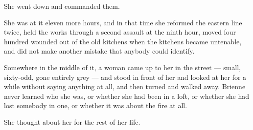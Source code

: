 \sceneBreak

She went down and commanded them.

She was at it eleven more hours, and in that time she reformed the eastern line twice, held the works through a second assault at the ninth hour, moved four hundred wounded out of the old kitchens when the kitchens became untenable, and did not make another mistake that anybody could identify.

Somewhere in the middle of it, a woman came up to her in the street — small, sixty-odd, gone entirely grey — and stood in front of her and looked at her for a while without saying anything at all, and then turned and walked away. Brienne never learned who she was, or whether she had been in a loft, or whether she had lost somebody in one, or whether it was about the fire at all.

She thought about her for the rest of her life.